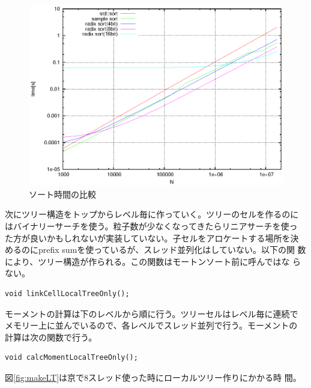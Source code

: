 \begin{figure}[h]
  \begin{center}
    \includegraphics[width=15cm]{fig/sorting_time.eps}
  \end{center}
  \caption{ソート時間の比較}
  \label{fig:sorting_time}
\end{figure}

\newpage

次にツリー構造をトップからレベル毎に作っていく。ツリーのセルを作るのに
はバイナリーサーチを使う。粒子数が少なくなってきたらリニアサーチを使っ
た方が良いかもしれないが実装していない。子セルをアロケートする場所を決
めるのにprefix sumを使っているが、スレッド並列化はしていない。以下の関
数により、ツリー構造が作られる。この関数はモートンソート前に呼んではな
らない。

\begin{screen}
\begin{verbatim}
void linkCellLocalTreeOnly();
\end{verbatim}
\end{screen}

モーメントの計算は下のレベルから順に行う。ツリーセルはレベル毎に連続で
メモリー上に並んでいるので、各レベルでスレッド並列で行う。モーメントの
計算は次の関数で行う。

\begin{screen}
\begin{verbatim}
void calcMomentLocalTreeOnly();
\end{verbatim}
\end{screen}


図\ref{fig:makeLT}は京で8スレッド使った時にローカルツリー作りにかかる時
間。

